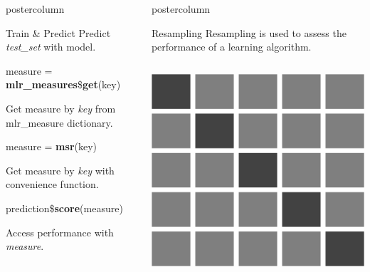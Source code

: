 \documentclass{beamer}
\newlength{\columnheight} %
\begin{document}
\begin{frame}[fragile]{}
\begin{columns}
\begin{column}{.245\textwidth}
\begin{beamercolorbox}[center]{postercolumn}
\begin{minipage}{.98\textwidth}
{\begin{myblock}{Train \& Predict}
					Predict \textit{test\_set} with model.
					\\
					\begin{codebox}
						measure = \textbf{mlr\_measures}\$\textbf{get}(key)
					\end{codebox}
					Get measure by \textit{key} from mlr\_measure dictionary.
					\\
					\begin{codebox}
						measure = \textbf{msr}(key)
					\end{codebox}
					Get measure by \textit{key} with convenience function.
					\\
					\begin{codebox}
						prediction\$\textbf{score}(measure)
					\end{codebox}
					Access performance with \textit{measure}.
				\end{myblock}
										}
			\end{minipage}
		\end{beamercolorbox}
	\end{column}
		\begin{column}{.245\textwidth}
		  \begin{beamercolorbox}[center]{postercolumn}
			   \begin{minipage}{.98\textwidth}
				  \parbox[t][\columnheight]{\textwidth}{
					  \begin{myblock}{Resampling}
						  Resampling is used to assess the performance of a learning algorithm.
						  \\[\baselineskip]
						    \begin{minipage}{\textwidth}
							    \begin{columns}[T]
								    \begin{column}{0.2\textwidth}\leftskip=14pt
									    \includegraphics[width=\textwidth]{img/cross_validation.png}

\end{column}
\end{columns}
\end{minipage}
\end{myblock}}
\end{minipage}
\end{beamercolorbox}
\end{column}
\end{columns}
\end{frame}
\end{document}
